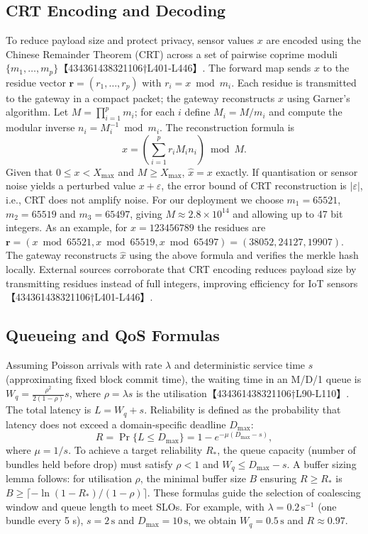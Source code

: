 \documentclass[12pt,onecolumn]{IEEEtran} %
\begin{document}
\subsection{CRT Encoding and Decoding}
To reduce payload size and protect privacy, sensor values \(x\) are encoded using the
Chinese Remainder Theorem (CRT) across a set of pairwise coprime moduli
\(\{m_1,\ldots,m_p\}\)【434361438321106†L401-L446】.  The forward map sends \(x\) to the residue
vector \(\mathbf{r}=(r_1,\ldots,r_p)\) with \(r_i = x \bmod m_i\).  Each residue is transmitted
to the gateway in a compact packet; the gateway reconstructs \(x\) using Garner’s algorithm.
Let \(M=\prod_{i=1}^p m_i\); for each \(i\) define \(M_i=M/m_i\) and compute the modular
inverse \(n_i = M_i^{-1} \bmod m_i\).  The reconstruction formula is
\begin{equation}
\hat{x} = \left(\sum_{i=1}^p r_i M_i n_i\right) \bmod M.
\end{equation}
Given that \(0 \le x < X_{\max}\) and \(M \ge X_{\max}\), \(\hat{x}=x\) exactly.  If
quantisation or sensor noise yields a perturbed value \(x + \varepsilon\), the error bound
of CRT reconstruction is \(|\varepsilon|\), i.e., CRT does not amplify noise.  For our
deployment we choose \(m_1=65521\), \(m_2=65519\) and \(m_3=65497\), giving \(M\approx2.8\times10^{14}\)
and allowing up to 47 bit integers.  As an example, for \(x=123456789\) the residues are
\(\mathbf{r}=(x\bmod65521, x\bmod65519, x\bmod65497)=(38052, 24127, 19907)\).  The gateway
reconstructs \(\hat{x}\) using the above formula and verifies the merkle hash locally.
External sources corroborate that CRT encoding reduces payload size by transmitting
residues instead of full integers, improving efficiency for IoT sensors【434361438321106†L401-L446】.

\subsection{Queueing and QoS Formulas}
Assuming Poisson arrivals with rate \(\lambda\) and deterministic service time \(s\)
(approximating fixed block commit time), the waiting time in an M/D/1 queue is
\(W_q = \frac{\rho^2}{2(1-\rho)}s\), where \(\rho=\lambda s\) is the utilisation【434361438321106†L90-L110】.
The total latency is \(L = W_q + s\).  Reliability is defined as the probability that
latency does not exceed a domain‑specific deadline \(D_{\max}\):
\begin{equation}
R = \Pr\{L \le D_{\max}\} = 1 - e^{-\mu (D_{\max}-s)},
\end{equation}
where \(\mu=1/s\).  To achieve a target reliability \(R_\ast\), the queue capacity (number
of bundles held before drop) must satisfy \(\rho < 1\) and \(W_q \le D_{\max} - s\).
A buffer sizing lemma follows: for utilisation \(\rho\), the minimal buffer size \(B\)
ensuring \(R \ge R_\ast\) is \(B \ge \lceil -\ln(1-R_\ast)/(1-\rho)\rceil\).  These formulas
guide the selection of coalescing window and queue length to meet SLOs.  For example,
with \(\lambda=0.2\,\text{s}^{-1}\) (one bundle every 5 s), \(s=2\,\text{s}\) and
\(D_{\max}=10\,\text{s}\), we obtain \(W_q=0.5\,\text{s}\) and \(R\approx0.97\).
\end{document}
